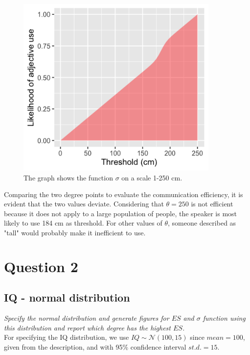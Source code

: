 \documentclass[11pt,a4paper,oneside]{article}
\begin{document}
\begin{figure}[H]
    \centering
    \includegraphics[width=100mm]{figs/Question_1_sigma.png}
    \caption{The graph shows the function $\sigma$ on a scale 1-250 cm.}
  \label{fig:q1_sigma}
\end{figure}

Comparing the two degree points to evaluate the communication efficiency, it is evident that the two values deviate. Considering that $\theta = 250$ is not efficient because it does not apply to a large population of people, the speaker is most likely to use 184 cm as threshold. For other values of $\theta$, someone described as "tall" would probably make it inefficient to use.

\section{Question 2}
\label{Q2}
\subsection{IQ - normal distribution}
\textit{Specify the normal distribution and generate figures for $ES$ and $\sigma$ function using this distribution and report which degree has the highest $ES$.}\\

For specifying the IQ distribution, we use $IQ \sim \mathcal{N}(100, 15)$ since $mean = 100$, given from the description, and with 95\% confidence interval $st.d. = 15$. 
\end{document}
